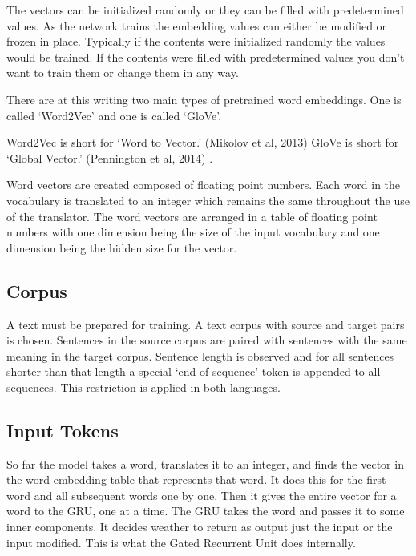 The vectors can be initialized randomly or they can be filled with predetermined values. As the network trains the embedding values can either be modified or frozen in place. Typically if the contents were initialized randomly the values would be trained. If the contents were filled with predetermined values you don\textquoteright t want to train them or change them in any way. 

There are at this writing two main types of pretrained word embeddings. One is called \textquoteleft Word2Vec\textquoteright{} and one is called \textquoteleft GloVe\textquoteright . 

Word2Vec is short for \textquoteleft Word to Vector.\textquoteright{} (Mikolov et al, 2013)\cite{mikolov2013efficient} GloVe is short for \textquoteleft Global Vector.\textquoteright{} (Pennington et al, 2014)\cite{pennington-etal-2014-glove} .

Word vectors are created composed of floating point numbers. Each word in the vocabulary is translated to an integer which remains the same throughout the use of the translator. The word vectors are arranged in a table of floating point numbers with one dimension being the size of the input vocabulary and one dimension being the hidden size for the vector.

\subsection*{Corpus}

A text must be prepared for training. A text corpus with source and target pairs is chosen. Sentences in the source corpus are paired with sentences with the same meaning in the target corpus. Sentence length is observed and for all sentences shorter than that length a special `end-of-sequence' token is appended to all sequences. This restriction is applied in both languages.

\subsection*{Input Tokens}

So far the model takes a word, translates it to an integer, and finds the vector in the word embedding table that represents that word. It does this for the first word and all subsequent words one by one. Then it gives the entire vector for a word to the GRU, one at a time. The GRU takes the word and passes it to some inner components. It decides weather to return as output just the input or the input modified. This is what the Gated Recurrent Unit does internally.

